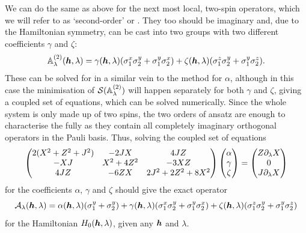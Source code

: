 We can do the same as above for the next most local, two-spin operators, which we will refer to as `second-order' or  . They too should be imaginary and, due to the Hamiltonian symmetry, can be cast into two groups with two different  coefficients $\gamma$ and $\zeta$:
\begin{equation}\label{eq:twospin_so_lcd}
        \mathbb{A}_{\lambda}^{(2)}(\boldsymbol{h}, \lambda) = \gamma(\boldsymbol{h}, \lambda) (\sigma^x_1 \sigma^y_2 + \sigma^y_1 \sigma^x_2) + \zeta(\boldsymbol{h}, \lambda) (\sigma^z_1 \sigma^y_2 + \sigma^y_1 \sigma^z_2).
\end{equation}
These can be solved for in a similar vein to the method for $\alpha$, although in this case the minimisation of $\mathcal{S}(\mathbb{A}_{\lambda}^{(2)})$ will happen separately for both $\gamma$ and $\zeta$, giving a coupled set of equations, which can be solved numerically. Since the whole system is only made up of two spins, the two orders of  ansatz are enough to characterise the  fully as they contain all completely imaginary orthogonal operators in the Pauli basis. Thus, solving the coupled set of equations
\begin{equation}\label{eq:two_spin_coupled_eqs}
        \begin{pmatrix}
        2(X^2 + Z^2 + J^2) & - 2JX & 4JZ \\ 
        -XJ & X^2 + 4Z^2 & -3XZ \\ 
        4JZ & -6ZX & 2J^2 + 2Z^2 + 8X^2
        \end{pmatrix} 
        \begin{pmatrix}
            \alpha \\
            \gamma \\
            \zeta
        \end{pmatrix} = 
        \begin{pmatrix}
            Z \partial_{\lambda} X \\
            0 \\
            J \partial_{\lambda} X
        \end{pmatrix}
\end{equation}
for the coefficients $\alpha$, $\gamma$ and $\zeta$ should give the exact  operator 
\begin{equation}\label{eq:two_spin_exact_AGP}
    \mathcal{A}_{\lambda}(\boldsymbol{h}, \lambda) = \alpha(\boldsymbol{h}, \lambda) (\sigma^y_1 + \sigma^y_2) + \gamma(\boldsymbol{h}, \lambda) (\sigma^x_1 \sigma^y_2 + \sigma^y_1 \sigma^x_2) + \zeta(\boldsymbol{h}, \lambda) (\sigma^z_1 \sigma^y_2 + \sigma^y_1 \sigma^z_2)
\end{equation}
for the Hamiltonian $H_0(\boldsymbol{h}, \lambda)$, given any $\boldsymbol{h}$ and $\lambda$. 

